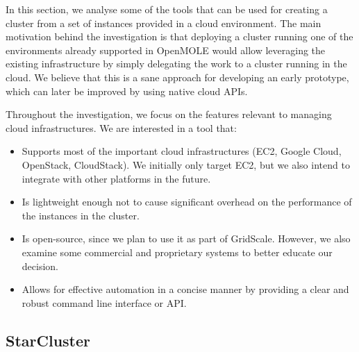 In this section, we analyse some of the tools that can be used for creating a cluster from a set of instances provided in a cloud environment. The main motivation behind the investigation is that deploying a cluster running one of the environments already supported in OpenMOLE would allow leveraging the existing infrastructure by simply delegating the work to a cluster running in the cloud. We believe that this is a sane approach for developing an early prototype, which can later be improved by using native cloud APIs. 

Throughout the investigation, we focus on the features relevant to managing cloud infrastructures. We are interested in a tool that:
\begin{itemize}
	\item Supports most of the important cloud infrastructures (EC2, Google Cloud, OpenStack, CloudStack). We initially only target EC2, but we also intend to integrate with other platforms in the future.
	\item Is lightweight enough not to cause significant overhead on the performance of the instances in the cluster.
	\item Is open-source, since we plan to use it as part of GridScale. However, we also examine some commercial and proprietary systems to better educate our decision.
	\item Allows for effective automation in a concise manner by providing a clear and robust command line interface or API.
\end{itemize}





\subsection{StarCluster}

